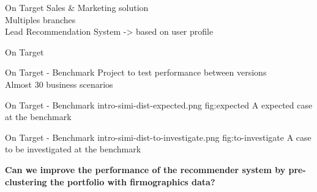\begin{frame}{On Target} \pause
    Sales \& Marketing solution\\  \pause
    \vspace{0.5cm}
    Multiples branches \\  \pause
    \vspace{0.5cm}
    Lead Recommendation System \pause
    -> based on user profile
    \vspace{0.5cm}
\end{frame}


\begin{frame}{On Target}
\end{frame}


\begin{frame}{On Target - Benchmark} \pause
    \vspace{0.5cm}
    Project to test performance between versions \\ \pause
    \vspace{0.5cm}
    Almost 30 business scenarios
\end{frame}

%

\begin{frame}{On Target - Benchmark}
    \vspace{0.5cm}
    \imagem
        {intro-simi-dist-expected.png}
        {fig:expected}
        {A expected case at the benchmark}
\end{frame}


\begin{frame}{On Target - Benchmark}
    \imagem
        {intro-simi-dist-to-investigate.png}
        {fig:to-investigate}
        {A case to be investigated at the benchmark}
\end{frame}


\begin{frame}{}
    \begin{center}
        \huge{\textbf{Can we improve the performance of the recommender system by pre-clustering the portfolio \pause
        with firmographics data?}}
    \end{center}
\end{frame}


